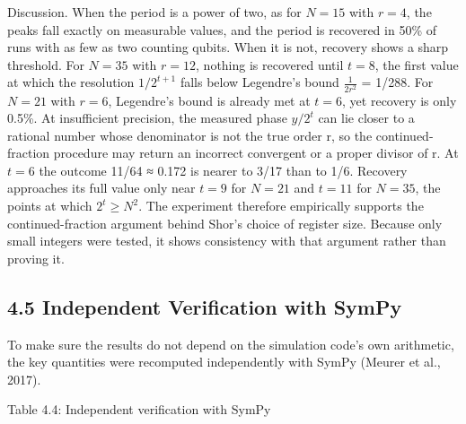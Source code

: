 \documentclass[12pt,oneside]{report}
\begin{document}
Discussion. When the period is a power of two, as for $N = 15$ with $r = 4$, the peaks fall exactly on measurable values, and the period is recovered in 50\% of runs with as few as two counting qubits. When it is not, recovery shows a sharp threshold. For $N = 35$ with $r = 12$, nothing is recovered until $t = 8$, the first value at which the resolution $1/2^{t+1}$ falls below Legendre's bound $\frac{1}{2r^{2}}$ = 1/288. For $N = 21$ with $r = 6$, Legendre's bound is already met at $t = 6$, yet recovery is only 0.5\%. At insufficient precision, the measured phase $y/2^{t}$ can lie closer to a rational number whose denominator is not the true order r, so the continued-fraction procedure may return an incorrect convergent or a proper divisor of r. At $t = 6$ the outcome 11/64 ≈ 0.172 is nearer to 3/17 than to 1/6. Recovery approaches its full value only near $t = 9$ for $N = 21$ and $t = 11$ for $N = 35$, the points at which $2^{t} \ge N^{2}$. The experiment therefore empirically supports the continued-fraction argument behind Shor's choice of register size. Because only small integers were tested, it shows consistency with that argument rather than proving it.
\par

\subsection*{4.5 Independent Verification with SymPy}

To make sure the results do not depend on the simulation code's own arithmetic, the key quantities were recomputed independently with SymPy (Meurer et al., 2017).
\par

\label{tab:4.4}Table 4.4: Independent verification with SymPy
\par
\end{document}
